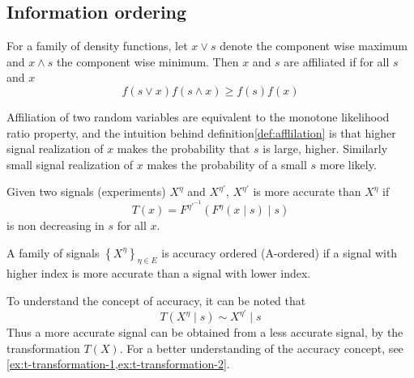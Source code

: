 \documentclass[10pt,a4paper]{article} 					%
\begin{document}

\subsection{Information ordering}

\begin{defn}\label{def:afflilation} \parencite{Milgrom1982}
For a family of density functions, let $x\lor s$ denote the component wise maximum and $x\land s$ the component wise minimum. Then $x$ and $s$ are affiliated if for all $s$ and $x$
\[
	f(s\lor x)f(s\land x)\ge f(s)f(x)
\]
\end{defn}

Affiliation of two random variables are equivalent to the monotone likelihood ratio property, and the intuition behind definition\cref{def:afflilation} is that higher signal realization of $x$ makes the probability that $s$ is large, higher. Similarly small signal realization of $x$ makes the probability of a small $s$ more likely.

\begin{defn}\label{def:accuracy}
\parencite{Persico2000} Given two signals (experiments) $X^{\eta}$ and $X^{\eta'}$, $X^{\eta'}$ is more accurate than $X^{\eta}$ if
\[
	T(x)=F^{\eta'^{-1}}(F^{\eta}(x\mid s)\mid s)\label{eq:acuracy tranformation}
\]
is non decreasing in $s$ for all $x$.

A family of signals $\left \{ X^{\eta}\right \} _{\eta\in E}$ is accuracy ordered (A-ordered) if a signal with higher index is more accurate than a signal with lower index.
\end{defn}

To understand the concept of accuracy, it can be noted that
\[
	T(X^{\eta}\mid s)\sim X^{\eta'}\mid s
\]
Thus a more accurate signal can be obtained from a less accurate signal, by the transformation $T(X)$. For a better understanding of the accuracy concept, see \cref{ex:t-transformation-1,ex:t-transformation-2}.
\end{document}
